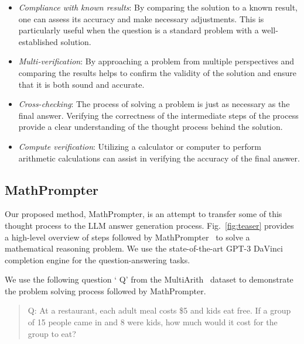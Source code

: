 \begin{itemize}[wide,labelindent=0pt]
    \item  \textit{Compliance with known results}: By comparing the solution to a known result, one can assess its accuracy and make necessary adjustments. This is particularly useful when the question is a standard problem with a well-established solution. \label{checkanswer}

    \item \textit{Multi-verification}: By approaching a problem from multiple perspectives and comparing the results helps to confirm the validity of the solution and ensure that it is both sound and accurate.\label{differentmethods}

    \item \textit{Cross-checking}: The process of solving a problem is just as necessary as the final answer. Verifying the correctness of the intermediate steps of the process provide a clear understanding of the thought process behind the solution.\label{intermediatesteps}

    \item \textit{Compute verification}: Utilizing a calculator or computer to perform arithmetic calculations can assist in verifying the accuracy of the final answer. \label{calculator}

\end{itemize}

\subsection{MathPrompter~ }

Our proposed method, MathPrompter, is an attempt to transfer some of this thought process to the LLM answer generation process. Fig.~\ref{fig:teaser} provides a high-level overview of steps followed by MathPrompter~ to solve a mathematical reasoning problem. We use the state-of-the-art GPT-3 DaVinci completion engine \cite{brown2020language} for the question-answering tasks.

We use the following question `{\color{gray} Q}' from the MultiArith~ dataset to demonstrate the problem solving process followed by MathPrompter.

\begin{quotation}
     {\color{gray} Q: \textcolor{example_color}{At a restaurant, each adult meal costs \$5 and kids eat free. If a group of 15 people came in and 8 were kids, how much would it cost for the group to eat?}}
\end{quotation}

